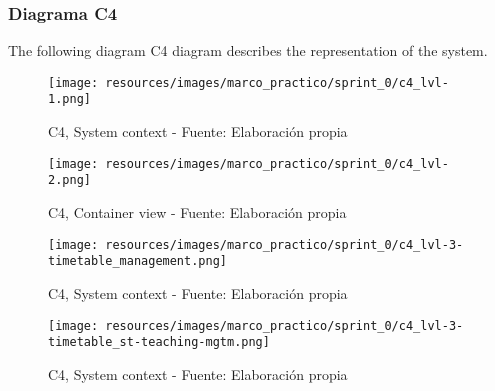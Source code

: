 \subsubsection{Diagrama C4}
The following diagram C4 diagram describes the representation of the system.
\begin{figure}[H]
    \centering
    \texttt{[image: resources/images/marco\_practico/sprint\_0/c4\_lvl-1.png]}
    \caption{C4, System context - Fuente: Elaboración propia}
    \label{fig:c4_lvl_1}
\end{figure}
\begin{figure}[H]
    \centering
    \texttt{[image: resources/images/marco\_practico/sprint\_0/c4\_lvl-2.png]}
    \caption{C4, Container view - Fuente: Elaboración propia}
    \label{fig:c4_lvl_2}
\end{figure}
\begin{figure}[H]
    \centering
    \texttt{[image: resources/images/marco\_practico/sprint\_0/c4\_lvl-3-timetable\_management.png]}
    \caption{C4, System context - Fuente: Elaboración propia}
    \label{fig:c4_lvl_3a}
\end{figure}
\begin{figure}[H]
    \centering
    \texttt{[image: resources/images/marco\_practico/sprint\_0/c4\_lvl-3-timetable\_st-teaching-mgtm.png]}
    \caption{C4, System context - Fuente: Elaboración propia}
    \label{fig:c4_lvl_3b}
\end{figure}
